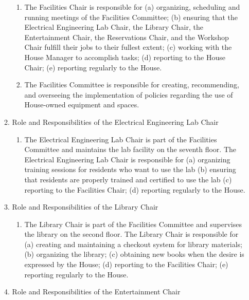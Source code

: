 \documentclass[letterpaper]{article}
\begin{document}
\begin{enumerate}
\begin{enumerate}
\begin{enumerate}
\item The Facilities Chair is responsible for (a) organizing, scheduling and running meetings of the Facilities Committee; (b) ensuring that the Electrical Engineering Lab Chair, the Library Chair, the Entertainment Chair, the Reservations Chair, and the Workshop Chair fulfill their jobs to their fullest extent; (c) working with the House Manager to accomplish tasks; (d) reporting to the House Chair; (e) reporting regularly to the House. 

\item The Facilities Committee is responsible for creating, recommending, and overseeing the implementation of policies regarding the use of House-owned equipment and spaces.

\end{enumerate}

\item Role and Responsibilities of the Electrical Engineering Lab Chair

\begin{enumerate}

\item The Electrical Engineering Lab Chair is part of the Facilities Committee and maintains the lab facility on the seventh floor. The Electrical Engineering Lab Chair is responsible for (a) organizing training sessions for residents who want to use the lab (b) ensuring that residents are properly trained and certified to use the lab (c) reporting to the Facilities Chair; (d) reporting regularly to the House.

\end{enumerate}

\item Role and Responsibilities of the Library Chair

\begin{enumerate}

\item The Library Chair is part of the Facilities Committee and supervises the library on the second floor. The Library Chair is responsible for (a) creating and maintaining a checkout system for library materials; (b) organizing the library; (c) obtaining new books when the desire is expressed by the House; (d) reporting to the Facilities Chair; (e) reporting regularly to the House.

\end{enumerate}

\item Role and Responsibilities of the Entertainment Chair 


\end{enumerate}
\end{enumerate}
\end{document}
